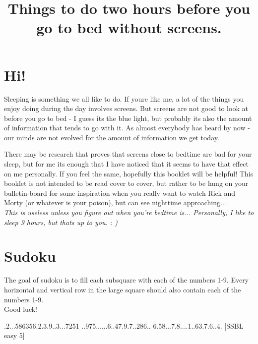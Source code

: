 \documentclass{article}
\title{Things to do two hours before you go to bed without screens.}
\date{}
\begin{document}
\renewcommand{\thesection}{}\maketitle
\clearpage
\begin{textit}
  \tableofcontents
\end{textit}

\section*{Hi!}
Sleeping is something we all like to do. If youre like me, a lot of the things you enjoy doing during the day involves screens.
But screens are not good to look at before you go to bed - I guess its the blue light, but probably its also the amount of information
that tends to go with it. As almost everybody has heard by now - our minds are not evolved for the amount of information we get today.

There may be research that proves that screens close to bedtime are bad for your sleep, but for me its enough that I have noticed that
it seems to have that effect on me personally. If you feel the same, hopefully this booklet will be helpful! 
This booklet is not intended to be read cover to cover, but rather to be hung on your bulletin-board for some inspiration when you really want
to watch Rick and Morty (or whatever is your poison), but can see nighttime approaching...
\\


\emph{This is useless unless you figure out when you're bedtime is... Personally, I like to sleep 9 hours, but thats up to you. : ) }
\\




\newpage

\section{Sudoku}
The goal of sudoku is to fill each subsquare with each of the numbers 1-9. Every horizontal and vertical row in the large square should also contain each of the numbers 1-9.
\\
Good luck! 


\cluefont{\LARGE}

\pagestyle{headings}

\renewcommand*{\puzzlefile}{se5.sud}
\writepuzzle%
{.2...5863}{56.2.3.9.}{.3...7251}%
{..975....}{..6..47.9}{.7..286..}%
{6.58...7.}{8....1..6}{3.7.6..4.}%
[SSBL easy 5]
\vfill
\begin{minipage}{0.95\linewidth}\begin{center}
\end{center}\end{minipage}
\end{document}
